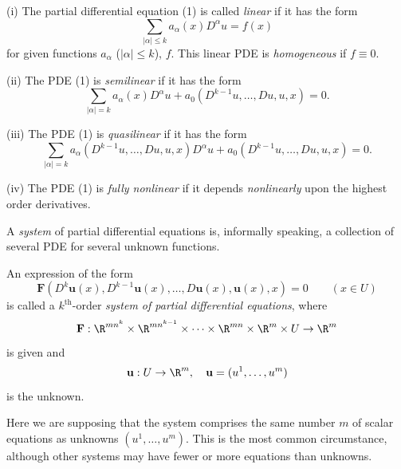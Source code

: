 \begin{definition}
\label{def:linear-semilinear-quasilinear-fully-nonlinear}
\leanok
(i) The partial differential equation (1) is called \textit{linear} if it has the form
$$\sum_{|\alpha| \leq k} a_\alpha(x) D^\alpha u = f(x)$$
for given functions $a_\alpha$ ($|\alpha| \leq k$), $f$. This linear PDE is \textit{homogeneous} if $f \equiv 0$.

(ii) The PDE (1) is \textit{semilinear} if it has the form
$$\sum_{|\alpha|=k} a_\alpha(x) D^\alpha u + a_0(D^{k-1}u, \ldots, Du, u, x) = 0.$$

(iii) The PDE (1) is \textit{quasilinear} if it has the form
$$\sum_{|\alpha|=k} a_\alpha(D^{k-1}u, \ldots, Du, u, x) D^\alpha u + a_0(D^{k-1}u, \ldots, Du, u, x) = 0.$$

(iv) The PDE (1) is \textit{fully nonlinear} if it depends \textit{nonlinearly} upon the highest order derivatives.
\end{definition}

A \textit{system} of partial differential equations is, informally speaking, a collection of several PDE for several unknown functions.

\begin{definition}
\label{def:kth-order-system-pde}
\leanok
An expression of the form
\begin{equation}
\mathbf{F}(D^k \mathbf{u}(x), D^{k-1}\mathbf{u}(x), \ldots, D\mathbf{u}(x), \mathbf{u}(x), x) = 0 \qquad (x \in U)
\tag{2}
\end{equation}
is called a $k^{\text{th}}$-order \textit{system of partial differential equations}, where
$$\mathbf{F} : \R^{mn^k} \times \R^{mn^{k-1}} \times \cdots \times \R^{mn} \times \R^m \times U \to \R^m$$
is given and
$$\mathbf{u} : U \to \R^m, \quad \mathbf{u} = (u^1, \ldots, u^m)$$
is the unknown.
\end{definition}

Here we are supposing that the system comprises the same number $m$ of scalar equations as unknowns $(u^1, \ldots, u^m)$. This is the most common circumstance, although other systems may have fewer or more equations than unknowns.

